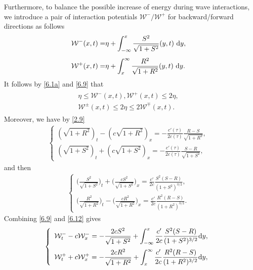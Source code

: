 \documentclass[11pt,reqno]{article}
\newcommand{\dps}{\displaystyle}
\newcommand{\fr}{\frac}
\numberwithin{equation}{section}
\begin{document}
Furthermore, to balance the possible increase of energy during
wave interactions, we introduce a pair of interaction potentials $\mathcal{W}^-/\mathcal{W}^+$ for backward/forward directions as follows
\begin{align}\label{6.9}
\begin{split}
\mathcal{W}^-(x,t)=&\eta+\int_{-\infty}^x\fr{S^2}{\sqrt{1+S^2}}(y,t)\ {\rm d}y,\\[4pt] \mathcal{W}^+(x,t)=&\eta+\int_{x}^\infty \fr{R^2}{\sqrt{1+R^2}}(y,t)\ {\rm d}y.
\end{split}
\end{align}
It follows by \eqref{6.1a} and \eqref{6.9} that
\begin{align}\label{6.10}
\begin{split}
\eta\leq \mathcal{W}^-(x,t), \mathcal{W}^+(x,t)\leq 2\eta, \\
\mathcal{W}^\pm(x,t)\leq 2\eta\leq 2\mathcal{W}^\mp(x,t).\
\end{split}
\end{align}
Moreover, we have by \eqref{2.9}
\begin{align}\label{6.11}
\left\{
\begin{array}{l}
\dps (\sqrt{1+R^2})_t-(c\sqrt{1+R^2})_x=-\fr{c'(\tau)}{2c(\tau)}\fr{R-S}{\sqrt{1+R^2}},\\[12pt]
\dps (\sqrt{1+S^2})_t+(c\sqrt{1+S^2})_x=-\fr{c'(\tau)}{2c(\tau)}\fr{S-R}{\sqrt{1+S^2}},
\end{array}
\right.
\end{align}
and then
\begin{align}\label{6.12}
\left\{
\begin{array}{l}
\dps \Big(\fr{S^2}{\sqrt{1+S^2}}\Big)_t +\Big(\fr{cS^2}{\sqrt{1+S^2}}\Big)_x=\fr{c'}{2c}\fr{S^2(S-R)}{(1+S^2)^{3/2}}, \\[12pt]
\dps \Big(\fr{R^2}{\sqrt{1+R^2}}\Big)_t -\Big(\fr{cR^2}{\sqrt{1+R^2}}\Big)_x=\fr{c'}{2c}\fr{R^2(R-S)}{(1+R^2)^{3/2}}.
\end{array}
\right.
\end{align}
Combining \eqref{6.9} and \eqref{6.12} gives
\begin{align*}
\left\{
\begin{array}{l}
\dps \mathcal{W}_t^--c\mathcal{W}_{x}^-=-\fr{2cS^2}{\sqrt{1+S^2}} +\int_{-\infty}^x\fr{c'}{2c}\fr{S^2(S-R)}{(1+S^2)^{3/2}}{\rm d}y, \\[12pt]
\dps \mathcal{W}_t^++c\mathcal{W}_{x}^+=-\fr{2cR^2}{\sqrt{1+R^2}} +\int_{x}^\infty\fr{c'}{2c}\fr{R^2(R-S)}{(1+R^2)^{3/2}}{\rm d}y,
\end{array}
\right.
\end{align*}
\end{document}
